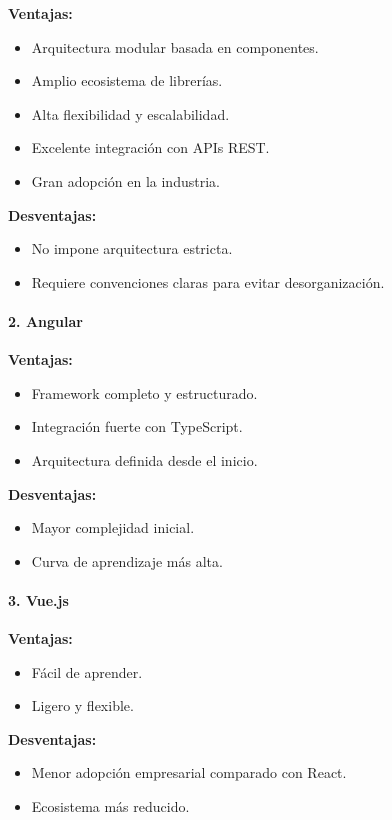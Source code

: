 \documentclass[12pt]{article}
\begin{document}
\textbf{Ventajas:}
\begin{itemize}
    \item Arquitectura modular basada en componentes.
    \item Amplio ecosistema de librerías.
    \item Alta flexibilidad y escalabilidad.
    \item Excelente integración con APIs REST.
    \item Gran adopción en la industria.
\end{itemize}

\textbf{Desventajas:}
\begin{itemize}
    \item No impone arquitectura estricta.
    \item Requiere convenciones claras para evitar desorganización.
\end{itemize}

\paragraph{2. Angular}

\textbf{Ventajas:}
\begin{itemize}
    \item Framework completo y estructurado.
    \item Integración fuerte con TypeScript.
    \item Arquitectura definida desde el inicio.
\end{itemize}

\textbf{Desventajas:}
\begin{itemize}
    \item Mayor complejidad inicial.
    \item Curva de aprendizaje más alta.
\end{itemize}

\paragraph{3. Vue.js}

\textbf{Ventajas:}
\begin{itemize}
    \item Fácil de aprender.
    \item Ligero y flexible.
\end{itemize}

\textbf{Desventajas:}
\begin{itemize}
    \item Menor adopción empresarial comparado con React.
    \item Ecosistema más reducido.
\end{itemize}
\end{document}
